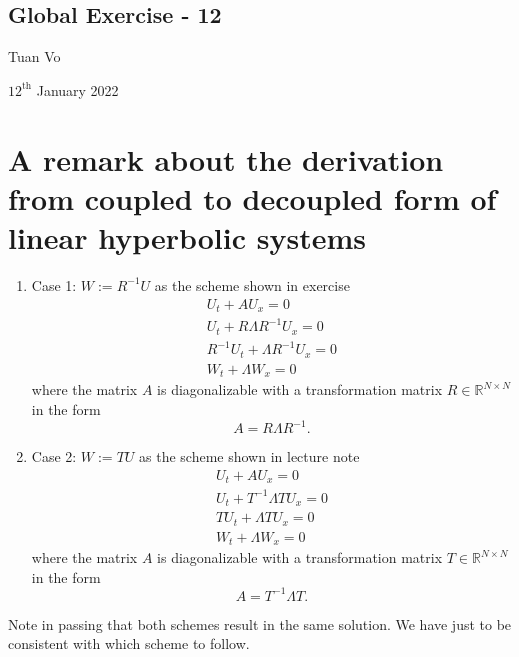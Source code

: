 \documentclass[12pt]{article}
\begin{document}
\begin{center}
	\section*{Global Exercise - 12}
\end{center}
\begin{center}
	Tuan Vo
\end{center}
\begin{center}
	$12^{\text{th}}$ January 2022
\end{center}
\section{A remark about the derivation from coupled to decoupled form of linear hyperbolic systems}
\begin{enumerate}
	\item Case 1: $W:=R^{-1}U$ as the scheme shown in exercise
	      \begin{equation*}
		      \boxed{
			      \begin{aligned}
				      U_{t} + AU_{x} = 0                     \\
				      U_{t} + R\Lambda R^{-1} U_{x} = 0      \\
				      R^{-1}U_{t} + \Lambda R^{-1} U_{x} = 0 \\
				      W_{t} + \Lambda W_{x} = 0                    
			      \end{aligned}
		      }
	      \end{equation*}
	      where the matrix $A$ is diagonalizable with a transformation matrix $R \in \mathbb{R}^{N\times N}$ in the form 
	      $$A=R\Lambda R^{-1}.$$
	      
	\item Case 2: $W:=TU$ as the scheme shown in lecture note
	      \begin{equation*}
		      \boxed{
			      \begin{aligned}
				      U_{t} + AU_{x} = 0                \\
				      U_{t} + T^{-1}\Lambda T U_{x} = 0 \\
				      TU_{t} + \Lambda TU_{x} = 0       \\
				      W_{t} + \Lambda W_{x} = 0                      
			      \end{aligned}
		      }
	      \end{equation*}
	      where the matrix $A$ is diagonalizable with a transformation matrix $T \in \mathbb{R}^{N\times N}$ in the form 
	      $$A= T^{-1} \Lambda T.$$
\end{enumerate}
Note in passing that both schemes result in the same solution. 
We have just to be consistent with which scheme to follow.
\end{document}

